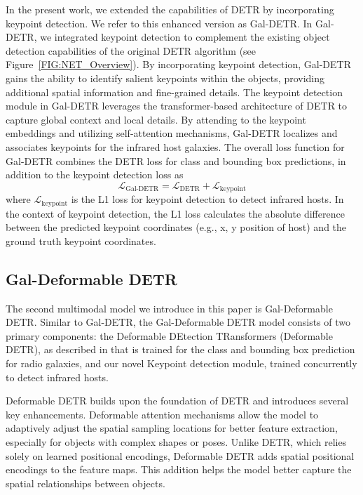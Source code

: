 \documentclass[
  journal=pasa,
  manuscript=research-paper, %
  year=2020,
  volume=37,
]{cup-journal}
\def \BE{\begin{equation}}
\def \EE{\end{equation}}
\begin{document}
In the present work, we extended the capabilities of DETR by incorporating keypoint detection.
We refer to this enhanced version as Gal-DETR.
In Gal-DETR, we integrated keypoint detection to complement the existing object detection capabilities of the original DETR algorithm (see Figure~\ref{FIG:NET_Overview}). 
By incorporating keypoint detection, Gal-DETR gains the ability to identify salient keypoints within the objects, providing additional spatial information and fine-grained details.
The keypoint detection module in Gal-DETR leverages the transformer-based architecture of DETR to capture global context and local details. 
By attending to the keypoint embeddings and utilizing self-attention mechanisms, Gal-DETR localizes and associates keypoints for the infrared host galaxies.
The overall loss function for Gal-DETR combines the DETR loss for class and bounding box predictions, in addition to the keypoint detection loss as
\BE
\mathcal{L}_{\text{Gal-DETR}} = \mathcal{L}_{\text{DETR}} +  \mathcal{L}_{\text{keypoint}}
\label{EQ:LossGalDETR}
\EE
where $\mathcal{L}_{\text{keypoint}}$ is the L1 loss for keypoint detection to detect infrared hosts. In the context of keypoint detection, the L1 loss calculates the absolute difference between the predicted keypoint coordinates (e.g., x, y position of host) and the ground truth keypoint coordinates.


\subsection{Gal-Deformable DETR}
\label{SEC:GaldDETR}
The second multimodal model we introduce in this paper is Gal-Deformable DETR. Similar to Gal-DETR, the Gal-Deformable DETR model consists of two primary components: the Deformable DEtection TRansformers (Deformable DETR), as described in \citet[][]{zhu2021deformable} that is trained for the class and bounding box prediction for radio galaxies, and our novel Keypoint detection module, trained concurrently to detect infrared hosts.

Deformable DETR builds upon the foundation of DETR and introduces several key enhancements.
Deformable attention mechanisms allow the model to adaptively adjust the spatial sampling locations for better feature extraction, especially for objects with complex shapes or poses.
Unlike DETR, which relies solely on learned positional encodings, Deformable DETR adds spatial positional encodings to the feature maps. This addition helps the model better capture the spatial relationships between objects.
\end{document}
